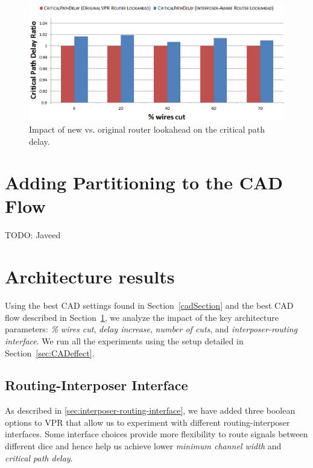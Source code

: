 \documentclass{sig-alternate-2013}
\begin{document}
\begin{figure}[!hb]
\centering
\includegraphics[width=\linewidth]{router_opt_fmax.eps}
\caption{Impact of new vs. original router lookahead on the critical path delay.}
\label{fig:lookahead_fmax}
\end{figure}

\section{Adding Partitioning to the CAD Flow}
\label{sec:CADflow}
TODO: Javeed

\section{Architecture results}
\label{resultsSection}

Using the best CAD settings found in Section~\ref{cadSection} and the best CAD flow described in Section~\ref{sec:CADflow}, we analyze the impact of the key architecture parameters: \textit{\% wires cut}, \textit{delay increase}, \textit{number of cuts}, and \textit{interposer-routing interface}. We run all the experiments using the setup detailed in Section~\ref{sec:CADeffect}.

\subsection{Routing-Interposer Interface}
As described in \ref{sec:interposer-routing-interface}, we have added three boolean options to VPR that allow us to experiment with different routing-interposer interfaces. Some interface choices provide more flexibility to route signals between different dice and hence help us achieve lower \textit{minimum channel width} and \textit{critical path delay}.
\end{document}
